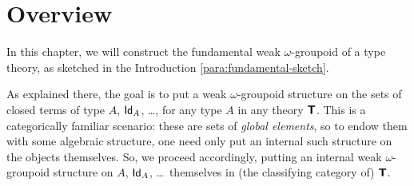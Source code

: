 % 
% 
% 
















\section{Overview}

In this chapter, we will construct the fundamental weak $\omega$-groupoid of a type theory, as sketched in the Introduction \ref{para:fundamental-sketch}.

As explained there, the goal is to put a weak $\omega$-groupoid structure on the sets of closed terms of type $A$, $\mathsf{Id}_A$, \ldots, for any type $A$ in any theory $\textbf{\textsf{T}}$.  This is a categorically familiar scenario: these are sets of \emph{global elements}, so to endow them with some algebraic structure, one need only put an internal such structure on the objects themselves.  So, we proceed accordingly, putting an internal weak $\omega$-groupoid structure on $A$, $\mathsf{Id}_A$, \ldots\ themselves in (the classifying category of) $\textbf{\textsf{T}}$.

